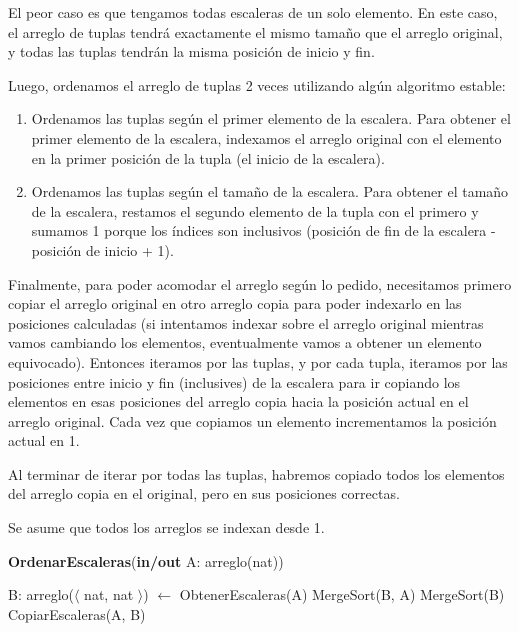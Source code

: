El peor caso es que tengamos todas escaleras de un solo elemento. En este caso, el arreglo de tuplas tendrá exactamente el mismo tamaño que el arreglo original, y todas las tuplas tendrán la misma posición de inicio y fin.

Luego, ordenamos el arreglo de tuplas 2 veces utilizando algún algoritmo estable:

\begin{enumerate}
    \item Ordenamos las tuplas según el primer elemento de la escalera. Para obtener el primer elemento de la escalera, indexamos el arreglo original con el elemento en la primer posición de la tupla (el inicio de la escalera).
    \item Ordenamos las tuplas según el tamaño de la escalera. Para obtener el tamaño de la escalera, restamos el segundo elemento de la tupla con el primero y sumamos 1 porque los índices son inclusivos (posición de fin de la escalera - posición de inicio + 1).
\end{enumerate}

Finalmente, para poder acomodar el arreglo según lo pedido, necesitamos primero copiar el arreglo original en otro arreglo copia para poder indexarlo en las posiciones calculadas (si intentamos indexar sobre el arreglo original mientras vamos cambiando los elementos, eventualmente vamos a obtener un elemento equivocado). Entonces iteramos por las tuplas, y por cada tupla, iteramos por las posiciones entre inicio y fin (inclusives) de la escalera para ir copiando los elementos en esas posiciones del arreglo copia hacia la posición actual en el arreglo original. Cada vez que copiamos un elemento incrementamos la posición actual en 1.

Al terminar de iterar por todas las tuplas, habremos copiado todos los elementos del arreglo copia en el original, pero en sus posiciones correctas.

Se asume que todos los arreglos se indexan desde 1.

\begin{algorithm}[H]
\caption{
    \textbf{OrdenarEscaleras}(\textbf{in/out} A: arreglo(nat))
}
\begin{algorithmic}[1]
    \State B: arreglo($\langle$ nat, nat $\rangle$) $\gets$ ObtenerEscaleras(A) 
    \State MergeSort(B, A) 
    \State MergeSort(B) 
    \State CopiarEscaleras(A, B) 
\end{algorithmic}
\end{algorithm}

